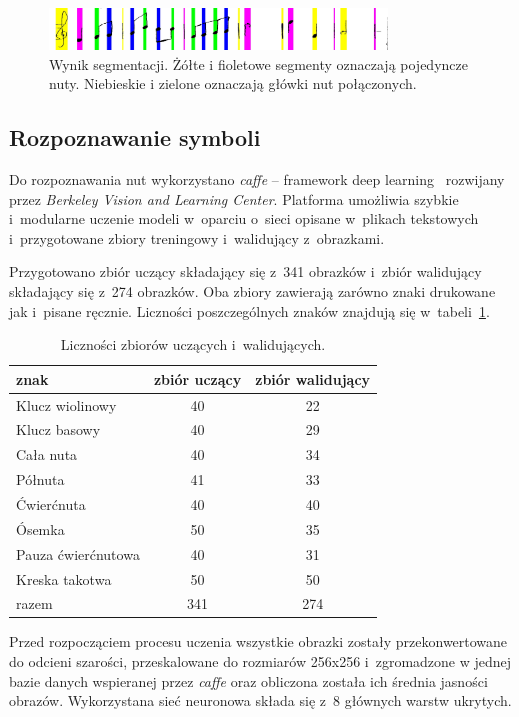 \documentclass[a4paper,11pt]{article}
\begin{document}
\begin{figure}
\centering
\includegraphics[width=0.8\textwidth]{argb.jpg}
\caption{Wynik segmentacji. Żółte i fioletowe segmenty oznaczają pojedyncze nuty. Niebieskie i zielone oznaczają główki nut połączonych.}
\label{fig:argb}
\end{figure}


\subsection{Rozpoznawanie symboli}

Do rozpoznawania nut wykorzystano \emph{caffe} -- framework deep learning~\cite{jia2014caffe} rozwijany przez \emph{Berkeley Vision and Learning Center}. Platforma umożliwia szybkie i~modularne uczenie modeli w~oparciu o~sieci opisane w~plikach tekstowych i~przygotowane zbiory treningowy i~walidujący z~obrazkami.

Przygotowano zbiór uczący składający się z~341 obrazków i~zbiór walidujący składający się z~274 obrazków. Oba zbiory zawierają zarówno znaki drukowane jak i~pisane ręcznie. Liczności poszczególnych znaków znajdują się w~tabeli~\ref{tab:train_val}.

\begin{table}
\centering
\begin{tabular}{l|c|c}
znak & zbiór uczący & zbiór walidujący \\ \hline
Klucz wiolinowy & 40 & 22 \\
Klucz basowy & 40 & 29 \\
Cała nuta & 40 & 34 \\
Półnuta & 41 & 33 \\
Ćwierćnuta & 40 & 40 \\
Ósemka & 50 & 35 \\
Pauza ćwierćnutowa & 40 & 31 \\
Kreska takotwa & 50 & 50 \\ \hline
razem & 341 & 274 \\
\end{tabular}
\caption{Liczności zbiorów uczących i~walidujących.}
\label{tab:train_val}
\end{table}

Przed rozpocząciem procesu uczenia wszystkie obrazki zostały przekonwertowane do odcieni szarości, przeskalowane do rozmiarów 256x256 i~zgromadzone w jednej bazie danych wspieranej przez \emph{caffe} oraz obliczona została ich średnia jasności obrazów. Wykorzystana sieć neuronowa składa się z~8 głównych warstw ukrytych.
\end{document}
